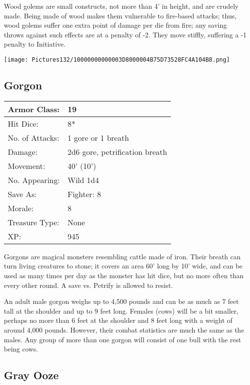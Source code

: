 \documentclass[a4paper,twoside,openany,10pt]{book}
\begin{document}
\begin{multicols}{2}
Wood golems are small constructs, not more than 4' in height, and are crudely made. Being made of wood makes them vulnerable to fire-based attacks; thus, wood golems suffer one extra point of damage per die from fire; any saving throws against such effects are at a penalty of -2. They move stiffly, suffering a -1 penalty to Initiative.

\begin{center}
	\texttt{[image: Pictures132/10000000000003D8000004B75D73528FC4A104B8.png]}
\end{center}

\subsection*{Gorgon}\label{gorgon}

\begin{tabularx}{0.48\textwidth}{@{}lX@{}}
Armor Class: & 19 \\\hline
Hit Dice: & 8* \\\hline
No. of Attacks: & 1 gore or 1 breath \\\hline
Damage: & 2d6 gore, petrification breath \\\hline
Movement: & 40' (10') \\\hline
No. Appearing: & Wild 1d4 \\\hline
Save As: & Fighter: 8 \\\hline
Morale: & 8 \\\hline
Treasure Type: & None \\\hline
XP: & 945 \\\hline
\end{tabularx}\medskip

Gorgons are magical monsters resembling cattle made of iron. Their breath can turn living creatures to stone; it covers an area 60' long by 10' wide, and can be used as many times per day as the monster has hit dice, but no more often than every other round. A save vs. Petrify is allowed to resist. 

An adult male gorgon weighs up to 4,500 pounds and can be as much as 7 feet tall at the shoulder and up to 9 feet long. Females (cows) will be a bit smaller, perhaps no more than 6 feet at the shoulder and 8 feet long with a weight of around 4,000 pounds. However, their combat statistics are much the same as the males. Any group of more than one gorgon will consist of one bull with the rest being cows.

\subsection*{Gray Ooze}\label{gray-ooze}


\end{multicols}
\end{document}
